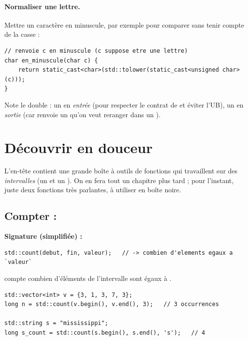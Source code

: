\documentclass[11pt]{article}
\begin{document}
\paragraph{Normaliser une lettre.} Mettre un caractère en minuscule, par
exemple pour comparer sans tenir compte de la casse :

\begin{lstlisting}
// renvoie c en minuscule (c suppose etre une lettre)
char en_minuscule(char c) {
    return static_cast<char>(std::tolower(static_cast<unsigned char>(c)));
}
\end{lstlisting}

Note le double  : un en \emph{entrée} (pour respecter le
contrat de  et éviter l'UB), un en \emph{sortie} (car
 renvoie un  qu'on veut reranger dans un ).

\section{Découvrir  en douceur}

L'en-tête  contient une grande boîte à outils de fonctions qui
travaillent sur des \emph{intervalles} (un  et un ). On en
fera tout un chapitre plus tard ; pour l'instant, juste deux fonctions très
parlantes, à utiliser en boîte noire.

\subsection*{Compter : }

\textbf{Signature (simplifiée) :}
\begin{lstlisting}
std::count(debut, fin, valeur);   // -> combien d'elements egaux a `valeur`
\end{lstlisting}

 compte combien d'éléments de
l'intervalle \code{[begin, end)} sont égaux à .

\begin{lstlisting}
std::vector<int> v = {3, 1, 3, 7, 3};
long n = std::count(v.begin(), v.end(), 3);   // 3 occurrences

std::string s = "mississippi";
long s_count = std::count(s.begin(), s.end(), 's');   // 4
\end{lstlisting}
\end{document}
